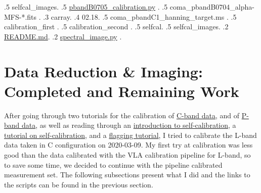 \documentclass[11pt,letterpaper]{article}
\begin{document}
{.5 selfcal\_images.
.5 \href{https://github.com/eliocentrisme/coma_data_reduction/blob/main/coma-pband/barray/07.05/pbandB0705_calibration.py}{pbandB0705\_calibration.py} .
.5 coma\_pbandB0704\_alpha-MFS-*.fits .
.3 carray.
.4 02.18.
.5 coma\_pbandC1\_hanning\_target.ms .
.5 calibration\_first .
.5 calibration\_second .
.5 selfcal.
.5 selfcal\_images.
.2 \href{https://github.com/eliocentrisme/coma_data_reduction/blob/main/README.md}{README.md}.
.2 \href{https://github.com/eliocentrisme/coma_data_reduction/blob/main/spectral_image.py}{spectral\_image.py} .
}


\section{Data Reduction \& Imaging: Completed and Remaining Work} \label{sec:data-reduction}
\par After going through two tutorials for the calibration of \href{https://casaguides.nrao.edu/index.php/VLA_Continuum_Tutorial_3C391-CASA6.4.1}{C-band data}, and of \href{https://casaguides.nrao.edu/index.php/VLA_Radio_galaxy_3C_129:_P-band_continuum_tutorial-CASA6.4.1}{P-band data}, as well as reading through an \href{https://casaguides.nrao.edu/index.php/First_Look_at_Self_Calibration_CASA_6.5.4}{introduction to self-calibration}, a \href{https://casaguides.nrao.edu/index.php/VLA_Self-calibration_Tutorial-CASA5.7.0}{tutorial on self-calibration}, and a \href{https://casaguides.nrao.edu/index.php/VLA_Flagging_Intro_Tutorial#RFlag}{flagging tutorial}, I tried to calibrate the L-band data taken in C configuration on 2020-03-09. My first try at calibration was less good than the data calibrated with the VLA calibration pipeline for L-band, so to save some time, we decided to continue with the pipeline calibrated measurement set. The following subsections present what I did and the links to the scripts can be found in the previous section.  %
\end{document}
